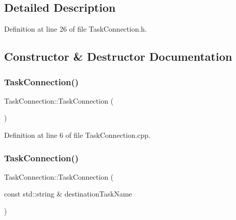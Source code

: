 \subsection{Detailed Description}


Definition at line 26 of file Task\+Connection.\+h.



\subsection{Constructor \& Destructor Documentation}
\hypertarget{classocra__recipes_1_1TaskConnection_a57b78d2652778a07949377622e86e5d7}{}\label{classocra__recipes_1_1TaskConnection_a57b78d2652778a07949377622e86e5d7} 
\subsubsection{\texorpdfstring{Task\+Connection()}{TaskConnection()}\hspace{0.1cm}{\footnotesize\ttfamily [1/2]}}
{\footnotesize\ttfamily Task\+Connection\+::\+Task\+Connection (\begin{DoxyParamCaption}{ }\end{DoxyParamCaption})}



Definition at line 6 of file Task\+Connection.\+cpp.

\hypertarget{classocra__recipes_1_1TaskConnection_a8a7b431e1c53e50428e3c369892d266e}{}\label{classocra__recipes_1_1TaskConnection_a8a7b431e1c53e50428e3c369892d266e} 
\subsubsection{\texorpdfstring{Task\+Connection()}{TaskConnection()}\hspace{0.1cm}{\footnotesize\ttfamily [2/2]}}
{\footnotesize\ttfamily Task\+Connection\+::\+Task\+Connection (\begin{DoxyParamCaption}\item[{const std\+::string \&}]{destination\+Task\+Name }\end{DoxyParamCaption})}



